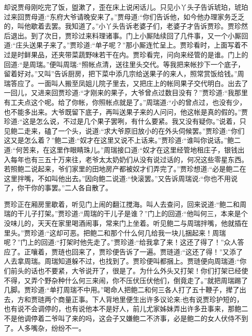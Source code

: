 \begin{parag}
    却说贾母刚吃完了饭，盥漱了，歪在床上说闲话儿。只见小丫头子告诉琥珀，琥珀过来回贾母道:“东府大爷请晚安来了。”贾母道:“你们告诉他，如今他办理家务乏乏的，叫他歇着去罢。我知道了。”小丫头告诉老婆子们，老婆子才告诉贾珍。贾珍然后退出。到了次日，贾珍过来料理诸事。门上小厮陆续回了几件事，又一个小厮回道:“庄头送果子来了。”贾珍道:“单子呢？”那小厮连忙呈上。贾珍看时，上面写着不过是时鲜果品，还夹带菜蔬野味若干在内。贾珍看完，问向来经管的是谁。门上的回道:“是周瑞。”便叫周瑞:“照帐点清，送往里头交代。等我把来帐抄下一个底子，留着好对。”又叫”告诉厨房，把下菜中添几宗给送果子的来人，照常赏饭给钱。”周瑞答应了。一面叫人搬至凤姐儿院子里去，又把庄上的帐同果子交代明白。出去了一回儿，又进来回贾珍道:“才刚来的果子，大爷曾点过数目没有？”贾珍道:“我那里有工夫点这个呢。给了你帐，你照帐点就是了。”周瑞道:“小的曾点过，也没有少，也不能多出来。大爷既留下底子，再叫送果子来的人问问，他这帐是真的假的。”贾珍道:“这是怎么说，不过是几个果子罢咧，有什么要紧。我又没有疑你。”说着，只见鲍二走来，磕了一个头，说道:“求大爷原旧放小的在外头伺候罢。”贾珍道:“你们这又是怎么着？”鲍二道:“奴才在这里又说不上话来。”贾珍道:“谁叫你说话。”鲍二道:“何苦来，在这里作眼睛珠儿。”周瑞接口道:“奴才在这里经管地租庄子，银钱出入每年也有三五十万来往，老爷太太奶奶们从没有说过话的，何况这些零星东西。若照鲍二说起来，爷们家里的田地房产都被奴才们弄完了。”贾珍想道:“必是鲍二在这里拌嘴，不如叫他出去。”因向鲍二说道:“快滚罢。”又告诉周瑞说:“你也不用说了，你干你的事罢。”二人各自散了。
\end{parag}


\begin{parag}
    贾珍正在厢房里歇着，听见门上闹的翻江搅海。叫人去查问，回来说道:“鲍二和周瑞的干儿子打架。”贾珍道:“周瑞的干儿子是谁？”门上的回道:“他叫何三，本来是个没味儿的，天天在家里喝酒闹事，常来门上坐着。听见鲍二与周瑞拌嘴，他就插在里头。”贾珍道:“这却可恶。把鲍二和那个什么何几给我一块儿捆起来！周瑞呢？”门上的回道:“打架时他先走了。”贾珍道:“给我拿了来！这还了得了！”众人答应了。正嚷着，贾琏也回来了，贾珍便告诉了一遍。贾琏道:“这还了得！”又添了人去拿周瑞。周瑞知道躲不过，也找到了。贾珍便叫都捆上。贾琏便向周瑞道:“你们前头的话也不要紧，大爷说开了，很是了。为什么外头又打架！你们打架已经使不得，又弄个野杂种什么何三来闹，你不压伏压伏他们，倒竟走了。”就把周瑞踢了几脚。贾珍道:“单打周瑞不中用。”喝命人把鲍二和何三各人打了五十鞭子，撵了出去，方和贾琏两个商量正事。下人背地里便生出许多议论来:也有说贾珍护短的，也有说不会调停的，也有说他本不是好人，前儿尤家姊妹弄出许多丑事来，那鲍二不是他调停着二爷叫了来的吗，这会子又嫌鲍二不济事，必是鲍二的女人伏侍不到了。人多嘴杂，纷纷不一。
\end{parag}


